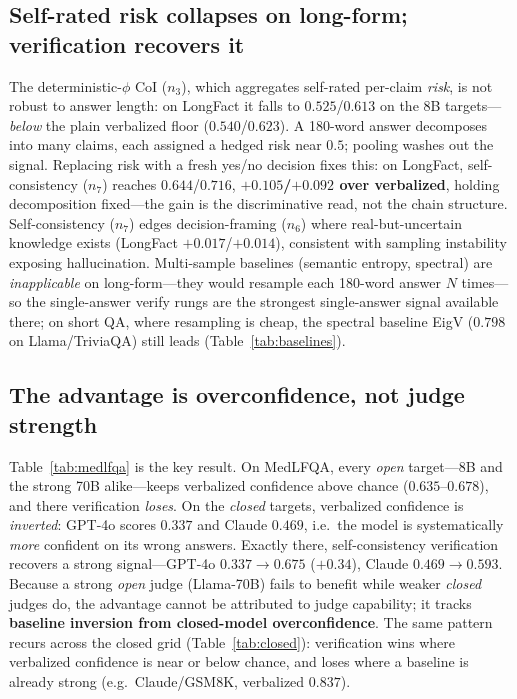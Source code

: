 \documentclass[11pt]{article}
\newcommand{\nphi}{$n_3$}      %
\newcommand{\nsc}{$n_7$}       %
\begin{document}
\subsection{Self-rated risk collapses on long-form; verification recovers it}
The deterministic-$\phi$ CoI (\nphi), which aggregates self-rated per-claim \emph{risk}, is
not robust to answer length: on LongFact it falls to $0.525$/$0.613$ on the 8B
targets---\emph{below} the plain verbalized floor ($0.540$/$0.623$). A 180-word answer
decomposes into many claims, each assigned a hedged risk near $0.5$; pooling washes out the
signal. Replacing risk with a fresh yes/no decision fixes this: on LongFact, self-consistency
(\nsc) reaches $0.644$/$0.716$, \textbf{$+0.105$/$+0.092$ over verbalized}, holding
decomposition fixed---the gain is the discriminative read, not the chain structure.
Self-consistency ($n_7$) edges decision-framing ($n_6$) where real-but-uncertain knowledge
exists (LongFact $+0.017$/$+0.014$), consistent with sampling instability exposing
hallucination. Multi-sample baselines (semantic entropy, spectral) are \emph{inapplicable} on
long-form---they would resample each 180-word answer $N$ times---so the single-answer verify
rungs are the strongest single-answer signal available there; on short QA, where resampling is
cheap, the spectral baseline EigV ($0.798$ on Llama/TriviaQA) still leads (Table~\ref{tab:baselines}).

\subsection{The advantage is overconfidence, not judge strength}
Table~\ref{tab:medlfqa} is the key result. On MedLFQA, every \emph{open} target---8B and the
strong 70B alike---keeps verbalized confidence above chance ($0.635$--$0.678$), and there
verification \emph{loses}. On the \emph{closed} targets, verbalized confidence is
\emph{inverted}: GPT-4o scores $0.337$ and Claude $0.469$, i.e.\ the model is systematically
\emph{more} confident on its wrong answers. Exactly there, self-consistency verification
recovers a strong signal---GPT-4o $0.337\rightarrow0.675$ ($+0.34$), Claude
$0.469\rightarrow0.593$. Because a strong \emph{open} judge (Llama-70B) fails to benefit while
weaker \emph{closed} judges do, the advantage cannot be attributed to judge capability; it
tracks \textbf{baseline inversion from closed-model overconfidence}. The same pattern recurs
across the closed grid (Table~\ref{tab:closed}): verification wins where verbalized confidence
is near or below chance, and loses where a baseline is already strong (e.g.\ Claude/GSM8K,
verbalized $0.837$).
\end{document}
